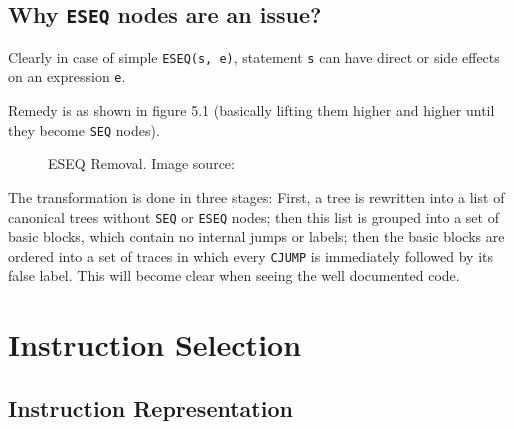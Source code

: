 \hypertarget{why-eseq-nodes-are-an-issue}{%
	\subsection{\texorpdfstring{Why
			\texttt{ESEQ}
			nodes are an
			issue?}{Why  nodes are an issue?}}\label{why-eseq-nodes-are-an-issue}}

Clearly in case of simple
\texttt{ESEQ(s, e)},
statement
\texttt{s} can
have direct or side effects on an expression
\texttt{e}.

Remedy is as shown in figure 5.1 (basically lifting them higher and
higher until they become
\texttt{SEQ}
nodes).

\begin{figure}
	\centering
	\caption{ESEQ Removal. Image source: \cite{tigerbook}}
\end{figure}

The transformation is done in three stages: First, a tree is rewritten
into a list of canonical trees without
\texttt{SEQ} or
\texttt{ESEQ}
nodes; then this list is grouped into a set of basic blocks, which
contain no internal jumps or labels; then the basic blocks are ordered
into a set of traces in which every
\texttt{CJUMP}
is immediately followed by its false label. This will become clear when
seeing the well documented code.

\section{Instruction Selection}


\hypertarget{instruction-representation}{%
	\subsection{Instruction
		Representation}\label{instruction-representation}}

